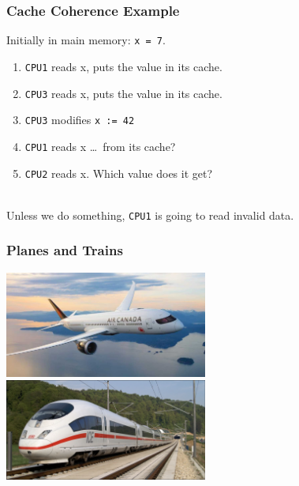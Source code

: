 \begin{frame}
  \frametitle{Cache Coherence Example}
\Large

  
  Initially in main memory: {\tt x = 7}.

  \begin{enumerate}
    \item {\tt CPU1} reads x, puts the value in its cache.
    \item {\tt CPU3} reads x, puts the value in its cache.
    \item {\tt CPU3} modifies {\tt x := 42}
    \item {\tt CPU1} reads x \ldots ~from its cache?
    \item {\tt CPU2} reads x. Which value does it get?
  \end{enumerate}
  ~\\

  Unless we do something, {\tt CPU1} is going to read invalid data.
  
\end{frame}



\begin{frame}
\frametitle{Planes and Trains}
\begin{center}
\includegraphics[width=0.5\textwidth]{images/aircanada.jpg}
\includegraphics[width=0.5\textwidth]{images/deutschebahn.png}
\end{center}
\end{frame}



